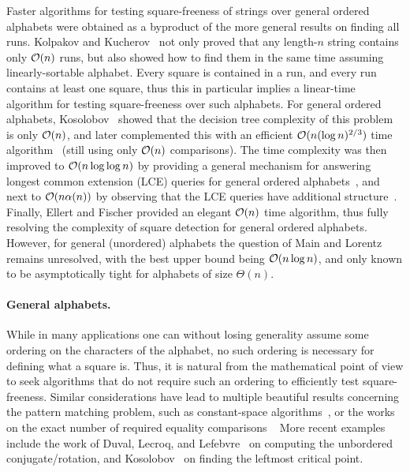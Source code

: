 Faster algorithms for testing square-freeness of strings over general ordered alphabets  were obtained as a byproduct of
the more general results on finding all runs. Kolpakov and Kucherov~\cite{Kolpakov1999} not only proved that any length-$n$
string contains only $\mathcal{O}(n)$ runs, but also showed how to find them in the same time assuming
linearly-sortable alphabet. Every square is contained in a run, and every run contains at least one square, thus this
in particular implies a linear-time algorithm for testing square-freeness over such alphabets. For general ordered alphabets,
Kosolobov~\cite{Kosolobov2015} showed that the decision tree complexity of this problem is only $\mathcal{O}(n)$, and later complemented this with an efficient $\mathcal{O}(n(\log n)^{2/3})$ time algorithm~\cite{Kosolobov2016}
(still using only $\mathcal{O}(n)$ comparisons). The time complexity was then improved to $\mathcal{O}(n\log\log n)$ by providing a general
mechanism for answering longest common extension (LCE) queries for general ordered alphabets~\cite{Gawrychowski2016},
and next to $\mathcal{O}(n\alpha(n))$ by observing that the LCE queries have additional structure~\cite{CrochemoreIKKPR16}.
Finally, Ellert and Fischer provided an elegant $\mathcal{O}(n)$ time algorithm, thus fully resolving the complexity of square detection
for general ordered alphabets. However, for general (unordered) alphabets the question of Main and Lorentz remains
unresolved, with the best upper bound being $\mathcal{O}(n\log n)$, and only known to be asymptotically tight for alphabets of
size $\Theta(n)$.

\paragraph{General alphabets.} While in many applications one can without losing generality assume some
ordering on the characters of the alphabet, no such ordering is necessary for defining what a square is. Thus, it is natural
from the mathematical point of view to seek algorithms that do not require such an ordering to efficiently test square-freeness.
Similar considerations have lead to multiple beautiful results concerning the pattern matching problem, such as constant-space algorithms~\cite{Galil1983,Breslauer1992},
or the works on the exact number of required equality comparisons ~\cite{Cole1995,Cole1997} 
 More recent examples include the work of Duval, Lecroq, and Lefebvre~\cite{Duval2014}
on computing the unbordered conjugate/rotation, and Kosolobov~\cite{Kosolobov2016a} on finding the leftmost critical point.

